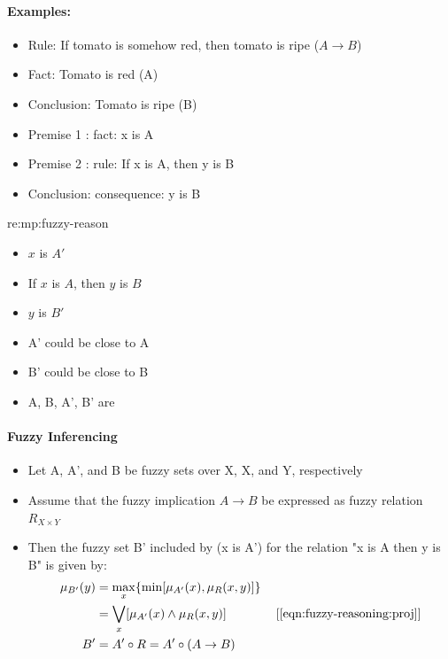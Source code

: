 \documentclass{tron}
\begin{document}
\paragraph{Examples:}
\begin{example}[MP]{}
	\begin{itemize}
		\item Rule: If tomato is somehow red, then tomato is ripe ($A \rightarrow B$)
		\item Fact: Tomato is red (A)
		\item Conclusion: Tomato is ripe (B)
	\end{itemize}
\end{example}
\begin{remark}{}
	\begin{itemize}
		\item Premise 1 : 		 fact: x is A
		\item Premise 2 : 		 rule: If x is A, then y is B
		\item Conclusion: consequence: y is B
	\end{itemize}
\end{remark}
\begin{remark}{re:mp:fuzzy-reason}
\begin{itemize}
	\item {} $x$ is $A'$ 
	\item {} If $x$ is $A$, then $y$ is $B$
	\item {} $y$ is $B'$
	\item A' could be close to A
	\item B' could be close to B
	\item A, B, A', B' are 
\end{itemize}
\end{remark}

\paragraph{Fuzzy Inferencing}
\begin{itemize}
	\item Let A, A', and B be fuzzy sets over X, X, and Y, respectively
	\item Assume that the fuzzy implication $A \rightarrow B$ be expressed as fuzzy relation $R_{X\times Y}$
	\item Then the fuzzy set B' included by (x is A') for the relation "x is A then y is B" is given by:
	\begin{align}
		\mu_{B'}(y) & = \underset{x}{\max} \{ \min [\mu_{A'} (x), \mu_R (x,y)] \} \\	
					& = \underset{x}{\bigvee} [\mu_{A'} (x) \land \mu_R (x,y)] \qquad\qquad [\Cref{eqn:fuzzy-reasoning:proj}]\\
				B'  & = A' \circ R = A' \circ (A\rightarrow B)
	\end{align}
\end{itemize}
\end{document}
